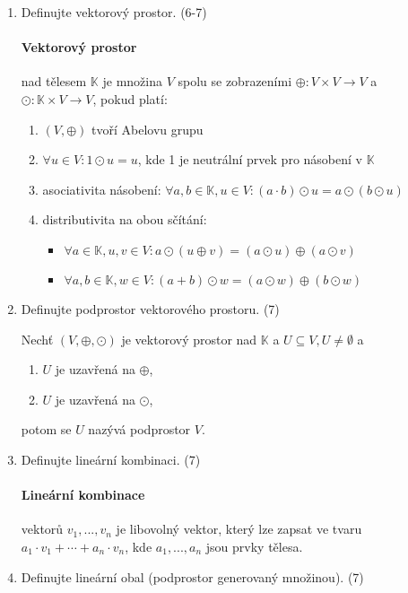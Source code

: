\documentclass[10pt,a4paper]{article}
\begin{document}
\begin{enumerate}
\item Definujte vektorový prostor. (6-7)

\paragraph{Vektorový prostor} nad tělesem $\mathbb{K}$ je množina $V$ spolu se zobrazeními $\oplus: V \times V \to V$ a $\odot: \mathbb{K} \times V \to V$, pokud platí:

\begin{enumerate}
\item $(V, \oplus)$ tvoří Abelovu grupu
\item $\forall u \in V: 1 \odot u = u$, kde 1 je neutrální prvek pro násobení v $\mathbb{K}$
\item asociativita násobení: $\forall a,b \in \mathbb{K}, u \in V: (a \cdot b) \odot u = a \odot (b \odot u)$
\item distributivita na obou sčítání:
\begin{itemize}
\item $\forall a \in \mathbb{K}, u,v \in V: a \odot (u \oplus v) = (a \odot u) \oplus (a \odot v)$
\item $\forall a,b \in \mathbb{K}, w \in V: (a+b) \odot w = (a \odot w) \oplus (b \odot w)$
\end{itemize}
\end{enumerate}

\item Definujte podprostor vektorového prostoru. (7)

Nechť $(V, \oplus, \odot)$ je vektorový prostor nad $\mathbb{K}$ a $U \subseteq V, U \neq \emptyset$ a 
\begin{enumerate}
\item $U$ je uzavřená na $\oplus$,
\item $U$ je uzavřená na $\odot$,
\end{enumerate}

potom se $U$ nazývá podprostor $V$. 

\item Definujte lineární kombinaci. (7)

\paragraph{Lineární kombinace} vektorů $v_1, ..., v_n$ je libovolný vektor, který lze zapsat ve tvaru $a_1 \cdot v_1 + \cdots + a_n \cdot v_n$, kde $a_1, ..., a_n$ jsou prvky tělesa.

\item Definujte lineární obal (podprostor generovaný množinou). (7)


\end{enumerate}
\end{document}
